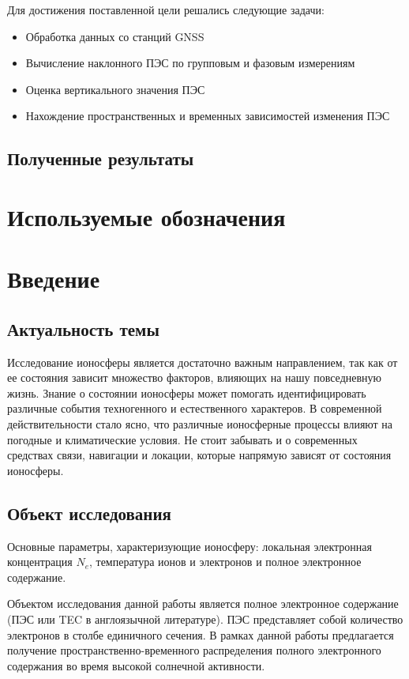 \documentclass[14pt]{article}
\begin{document}
Для достижения поставленной цели решались следующие задачи:
\begin{itemize}
\item Обработка данных со станций GNSS
\item Вычисление наклонного ПЭС по групповым и фазовым измерениям
\item Оценка вертикального значения ПЭС
\item Нахождение пространственных и временных зависимостей изменения ПЭС
\end{itemize}

\subsection*{Полученные результаты}

\newpage
\tableofcontents

\newpage
\section*{Используемые обозначения}

\newpage
\section*{Введение}
\subsection*{Актуальность темы}
Исследование ионосферы является достаточно важным направлением, так как от ее состояния зависит множество факторов, влияющих на нашу повседневную жизнь. Знание о состоянии ионосферы может помогать идентифицировать различные события техногенного и естественного характеров. В современной действительности стало ясно, что различные ионосферные процессы влияют на погодные и климатические условия. Не стоит забывать и о современных средствах связи, навигации и локации, которые напрямую зависят от состояния ионосферы.

\subsection*{Объект исследования}
Основные параметры, характеризующие ионосферу: локальная электронная концентрация $N_e$, температура ионов и электронов и полное электронное содержание.

Объектом исследования данной работы является полное электронное содержание (ПЭС или TEC в англоязычной литературе). ПЭС представляет собой количество электронов в столбе единичного сечения. В рамках данной работы предлагается получение пространственно-временного распределения полного электронного содержания во время высокой солнечной активности.
\end{document}
